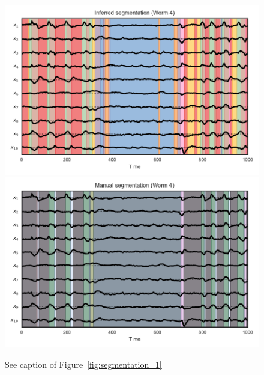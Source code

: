 \documentclass{article}
\begin{document}
\begin{figure}[h]
\centering%
\includegraphics[width=5.5in]{figures/arhmm/x_segmentation_3.pdf}
\includegraphics[width=5.5in]{figures/arhmm/x_segmentation_zimmer_3.pdf}
\caption{See caption of Figure~\ref{fig:segmentation_1}}
\label{fig:segmentation_4}
\end{figure}
\end{document}
